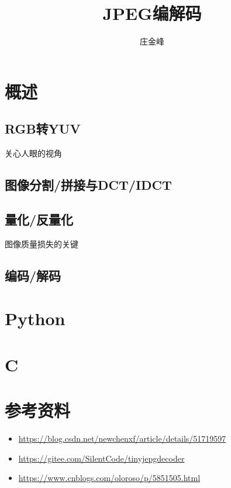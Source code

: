 \documentclass{article}
\title{JPEG编解码}
\author{庄金峰}
\begin{document}
\maketitle

\section{概述}

\subsection{RGB转YUV}

关心人眼的视角

\subsection{图像分割/拼接与DCT/IDCT}

\subsection{量化/反量化}

图像质量损失的关键

\subsection{编码/解码}

\section{Python}

\section{C}

\section{参考资料}

\begin{itemize}
\item \url{https://blog.csdn.net/newchenxf/article/details/51719597}
\item \url{https://gitee.com/SilentCode/tinyjepgdecoder}
\item \url{https://www.cnblogs.com/oloroso/p/5851505.html}
\end{itemize}
\end{document}
